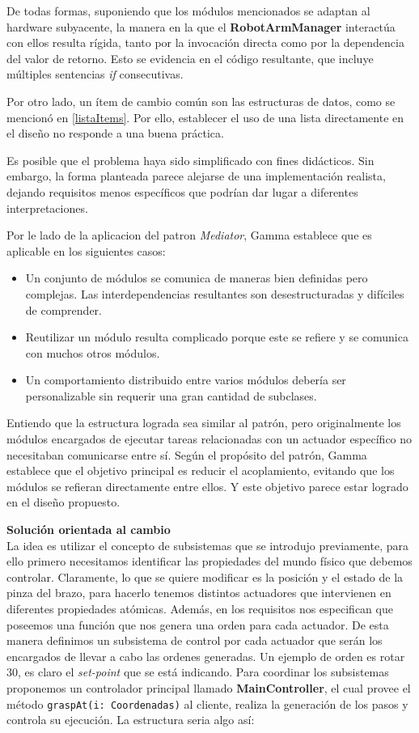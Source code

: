 De todas formas, suponiendo que los módulos mencionados se adaptan al hardware subyacente, la manera en la que el \textbf{RobotArmManager} interactúa con ellos resulta rígida, tanto por la invocación directa como por la dependencia del valor de retorno. Esto se evidencia en el código resultante, que incluye múltiples sentencias \textit{if} consecutivas.

Por otro lado, un ítem de cambio común son las estructuras de datos, como se mencionó en \ref{listaItems}. Por ello, establecer el uso de una lista directamente en el diseño no responde a una buena práctica.

Es posible que el problema haya sido simplificado con fines didácticos. Sin embargo, la forma planteada parece alejarse de una implementación realista, dejando requisitos menos específicos que podrían dar lugar a diferentes interpretaciones.

Por le lado de la aplicacion del patron \textit{Mediator}, Gamma establece que es aplicable en los siguientes casos:
\begin{itemize}
\item Un conjunto de módulos se comunica de maneras bien definidas pero complejas. Las interdependencias resultantes son desestructuradas y difíciles de comprender.

\item Reutilizar un módulo resulta complicado porque este se refiere y se comunica con muchos otros módulos.

\item Un comportamiento distribuido entre varios módulos debería ser personalizable sin requerir una gran cantidad de subclases.
\end{itemize}

Entiendo que la estructura lograda sea similar al patrón, pero originalmente los módulos encargados de ejecutar tareas relacionadas con un actuador específico no necesitaban comunicarse entre sí. Según el propósito del patrón, Gamma establece que el objetivo principal es reducir el acoplamiento, evitando que los módulos se refieran directamente entre ellos. Y este objetivo parece estar logrado en el diseño propuesto.

\noident
\textbf{Solución orientada al cambio}
\\
\noident
La idea es utilizar el concepto de subsistemas que se introdujo previamente, para ello primero necesitamos identificar las propiedades del mundo físico que debemos controlar. Claramente, lo que se quiere modificar es la posición y el estado de la pinza del brazo, para hacerlo tenemos distintos actuadores que intervienen en diferentes propiedades atómicas. Además, en los requisitos nos especifican que poseemos una función que nos genera una orden para cada actuador. De esta manera definimos un subsistema de control por cada actuador que serán los encargados de llevar a cabo las ordenes generadas. Un ejemplo de orden es rotar 30\textdegree, es claro el \textit{set-point} que se está indicando. Para coordinar los subsistemas proponemos un controlador principal llamado \textbf{MainController}, el cual provee el método \verb|graspAt(i: Coordenadas)| al cliente, realiza la generación de los pasos y controla su ejecución. La estructura seria algo así:


